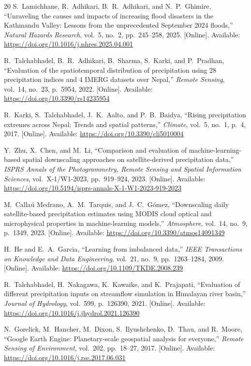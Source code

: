 \documentclass[conference]{IEEEtran}
\begin{document}
\begin{thebibliography}{20}
S.~Lamichhane, R.~Adhikari, B.~R.~Adhikari, and N.~P.~Ghimire, ``Unraveling the causes and impacts of increasing flood disasters in the Kathmandu Valley: Lessons from the unprecedented September 2024 floods,'' \emph{Natural Hazards Research}, vol.~5, no.~2, pp.~245--258, 2025. [Online]. Available: \url{https://doi.org/10.1016/j.nhres.2025.04.001}

R.~Talchabhadel, B.~R.~Adhikari, B.~Sharma, S.~Karki, and P.~Pradhan, ``Evaluation of the spatiotemporal distribution of precipitation using 28 precipitation indices and 4 IMERG datasets over Nepal,'' \emph{Remote Sensing}, vol.~14, no.~23, p.~5954, 2022. [Online]. Available: \url{https://doi.org/10.3390/rs14235954}

R.~Karki, S.~Talchabhadel, J.~K.~Aalto, and P.~B.~Baidya, ``Rising precipitation extremes across Nepal: Trends and spatial patterns,'' \emph{Climate}, vol.~5, no.~1, p.~4, 2017. [Online]. Available: \url{https://doi.org/10.3390/cli5010004}

Y.~Zhu, X.~Chen, and M.~Li, ``Comparison and evaluation of machine-learning-based spatial downscaling approaches on satellite-derived precipitation data,'' \emph{ISPRS Annals of the Photogrammetry, Remote Sensing and Spatial Information Sciences}, vol.~X-1/W1-2023, pp.~919--924, 2023. [Online]. Available: \url{https://doi.org/10.5194/isprs-annals-X-1-W1-2023-919-2023}

M.~Calla{\'u} Medrano, A.~M.~Tarquis, and J.~C.~G{\'o}mez, ``Downscaling daily satellite-based precipitation estimates using MODIS cloud optical and microphysical properties in machine-learning models,'' \emph{Atmosphere}, vol.~14, no.~9, p.~1349, 2023. [Online]. Available: \url{https://doi.org/10.3390/atmos14091349}

H.~He and E.~A.~Garcia, ``Learning from imbalanced data,'' \emph{IEEE Transactions on Knowledge and Data Engineering}, vol.~21, no.~9, pp.~1263--1284, 2009. [Online]. Available: \url{https://doi.org/10.1109/TKDE.2008.239}

R.~Talchabhadel, H.~Nakagawa, K.~Kawaike, and K.~Prajapati, ``Evaluation of different precipitation inputs on streamflow simulation in Himalayan river basin,'' \emph{Journal of Hydrology}, vol.~599, p.~126390, 2021. [Online]. Available: \url{https://doi.org/10.1016/j.jhydrol.2021.126390}

N.~Gorelick, M.~Hancher, M.~Dixon, S.~Ilyushchenko, D.~Thau, and R.~Moore, ``Google Earth Engine: Planetary-scale geospatial analysis for everyone,'' \emph{Remote Sensing of Environment}, vol.~202, pp.~18--27, 2017. [Online]. Available: \url{https://doi.org/10.1016/j.rse.2017.06.031}


\end{thebibliography}
\end{document}
